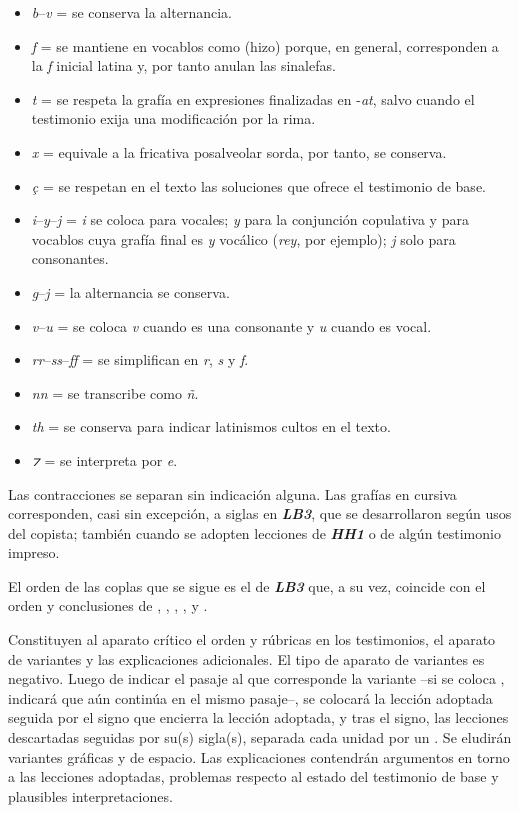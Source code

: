 \documentclass[11pt,twoside]{article}
\newcommand{\eg}{{\emph{\textbf{LB3}}}}
\newcommand{\hh}{\emph{\textbf{HH1}}}
\newcommand{\head}[1]{\def\mihead{#1}\thispagestyle{empty}} \def\mihead{} \newpagestyle{editio}{\sethead[\thepage][\ifx\mihead\empty\else\mihead\fi][]{}{\ifx\mihead\empty\else\mihead\fi}{\thepage}} \pagestyle{editio}
\begin{document}
%
\begin{itemize}[label=--]%
\item \emph{b}--\emph{v} = se conserva la alternancia.
\item \emph{f} = se mantiene en vocablos como  (hizo) porque, en general, corresponden a la \emph{f} inicial latina y, por tanto anulan las sinalefas.
\item \emph{t} = se respeta la grafía en expresiones finalizadas en -\emph{at}, salvo cuando el testimonio exija una modificación por la rima.
\item \emph{x} = equivale a la fricativa posalveolar sorda, por tanto, se conserva.
\item \emph{ç} = se respetan en el texto las soluciones que ofrece el testimonio de base.
\item \emph{i}--\emph{y}--\emph{j} = \emph{i} se coloca para vocales; \emph{y} para la conjunción copulativa y para vocablos cuya grafía final es \emph{y} vocálico (\emph{rey}, por ejemplo); \emph{j} solo para consonantes.
\item \emph{g}--\emph{j} = la alternancia se conserva.
\item \emph{v}--\emph{u} = se coloca \emph{v} cuando es una consonante y \emph{u} cuando es vocal.
\item \emph{rr}--\emph{ss}--\emph{ff} = se simplifican en \emph{r}, \emph{s} y \emph{f}.
\item \emph{nn} = se transcribe como \emph{ñ}.
\item \emph{th} = se conserva para indicar latinismos cultos en el texto.
\item \emph{⁊} = se interpreta por \emph{e}.%
\end{itemize}\par
%
Las contracciones se separan sin indicación alguna. Las grafías en cursiva corresponden, casi sin excepción, a siglas en {\eg}, que se desarrollaron según usos del copista; también cuando se adopten lecciones de {\hh} o de algún testimonio impreso.\par
%
El orden de las coplas que se sigue es el de {\eg} que, a su vez, coincide con el orden y conclusiones de \textcite{Senabre1983}, \textcite{Palumbo1983}, \textcite{Orduna1967}, \textcite{Beltrán1991,Beltrán2013}, \textcite{PérezPriego1990,PérezPriego2017} y \textcite{Foulché-Delbosc1902}.\par
%
Constituyen al aparato crítico el orden y rúbricas en los testimonios, el aparato de variantes y las explicaciones adicionales. El tipo de aparato de variantes es negativo. Luego de indicar el pasaje al que corresponde la variante --si se coloca , indicará que aún continúa en el mismo pasaje--, se colocará la lección adoptada seguida por el signo \comillas{]} que encierra la lección adoptada, y tras el signo, las lecciones descartadas seguidas por su(s) sigla(s), separada cada unidad por un \comillas{;}. Se eludirán variantes gráficas y de espacio. Las explicaciones contendrán argumentos en torno a las lecciones adoptadas, problemas respecto al estado del testimonio de base y plausibles interpretaciones.\par
\repage
%
\head{\textsc{Bibliografía}}
\end{document}
